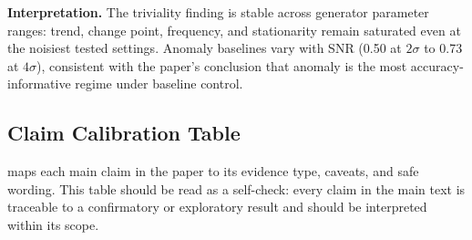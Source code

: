 \documentclass{article}
\begin{document}
\textbf{Interpretation.} The triviality finding is stable across generator parameter ranges: trend, change point, frequency, and stationarity remain saturated even at the noisiest tested settings. Anomaly baselines vary with SNR (0.50 at $2\sigma$ to 0.73 at $4\sigma$), consistent with the paper's conclusion that anomaly is the most accuracy-informative regime under baseline control.

\subsection{Claim Calibration Table}
\label{sec:claim_calibration}

 maps each main claim in the paper to its evidence type, caveats, and safe wording. This table should be read as a self-check: every claim in the main text is traceable to a confirmatory or exploratory result and should be interpreted within its scope.
\end{document}
